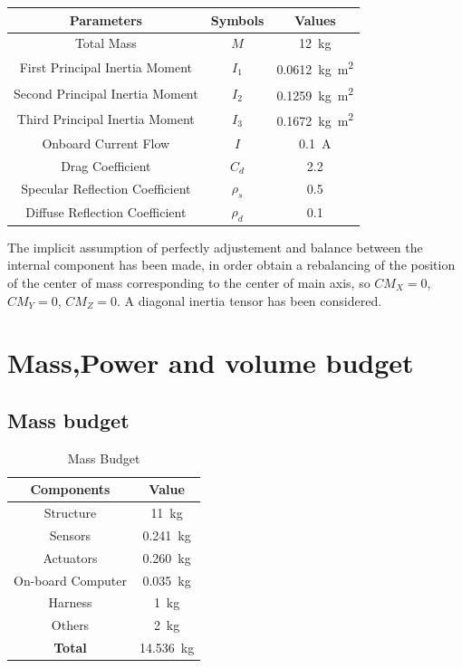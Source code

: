 \documentclass[11pt,a4paper]{report}
\begin{document}
\begin{table}[H]
	\centering
	\begin{tabular}{|c|c|c|}
		\hline
		Parameters & Symbols & Values \\
		\hline
		Total Mass & $M$ & \SI{12}{\kilo\gram}\\
        \hline
		First Principal Inertia Moment & $I_1$ & \SI{0.0612}{\kilo\gram\meter^2}\\
		\hline		
		Second Principal Inertia Moment & $I_2$ & \SI{0.1259}{\kilo\gram\meter^2}\\
		\hline
		Third Principal Inertia Moment & $I_3$ & \SI{0.1672}{\kilo\gram\meter^2}\\
		\hline
		Onboard Current Flow & $I$ & \SI{0.1}{\ampere}\\
		\hline
		Drag Coefficient & $C_d$ & 2.2 \\
		\hline
		Specular Reflection Coefficient & $\rho_{s}$ & 0.5 \\
		\hline
		Diffuse Reflection Coefficient & $\rho_{d}$ & 0.1 \\
		\hline
	\end{tabular}
\end{table}

The implicit assumption of perfectly adjustement and balance between the internal component has been made, in order obtain a rebalancing of the position of the center of mass corresponding to the center of main axis, so $CM_{X} = 0$, $CM_{Y} = 0$, $CM_{Z} = 0$.
A diagonal inertia tensor has been considered.

\section{Mass,Power and volume budget}

\subsection{Mass budget}

\begin{table}[H]
	\centering
	\begin{tabular}{|c|c|}
		\hline
		Components & Value \\
		\hline
		Structure & \SI{11}{\kilo\gram} \\
		\hline
	  	Sensors & \SI{0.241}{\kilo\gram}\\
		\hline
		Actuators & \SI{0.260}{\kilo\gram}\\
		\hline
		On-board Computer & \SI{0.035}{\kilo\gram}\\
		\hline
		Harness &  \SI{1}{\kilo\gram}\\
		\hline
        Others &  \SI{2}{\kilo\gram}\\
		\hline
		\textbf{Total} & \SI{14.536}{\kilo\gram}\\
		\hline 
	\end{tabular}
	\caption{Mass Budget}
\end{table}
\end{document}
